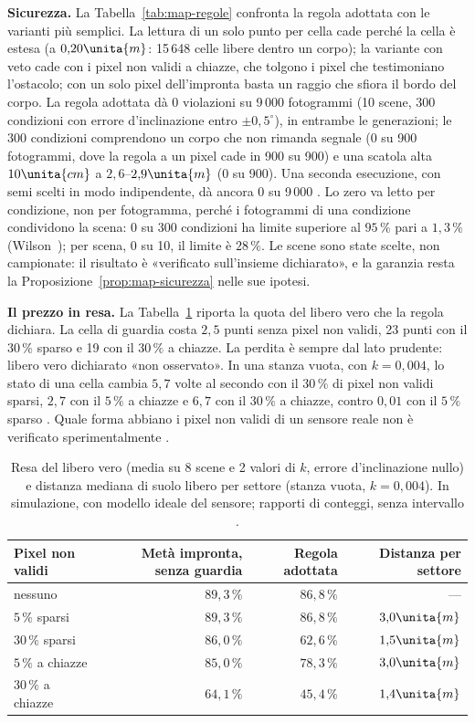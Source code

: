 \textbf{Sicurezza.} La Tabella~\ref{tab:map-regole} confronta la regola adottata con le varianti più semplici. La lettura di un solo punto per cella cade perché la cella è estesa (a $0{,}20\unita{m}$: 15\,648 celle libere dentro un corpo); la variante con veto cade con i pixel non validi a chiazze, che tolgono i pixel che testimoniano l'ostacolo; con un solo pixel dell'impronta basta un raggio che sfiora il bordo del corpo. La regola adottata dà 0 violazioni su 9\,000 fotogrammi (10 scene, 300 condizioni con errore d'inclinazione entro $\pm0{,}5^\circ$), in entrambe le generazioni; le 300 condizioni comprendono un corpo che non rimanda segnale (0 su 900 fotogrammi, dove la regola a un pixel cade in 900 su 900) e una scatola alta $10\unita{cm}$ a $2{,}6$–$2{,}9\unita{m}$ (0 su 900). Una seconda esecuzione, con semi scelti in modo indipendente, dà ancora 0 su 9\,000 . Lo zero va letto per condizione, non per fotogramma, perché i fotogrammi di una condizione condividono la scena: 0 su 300 condizioni ha limite superiore al $95\,\%$ pari a $1{,}3\,\%$ (Wilson~\cite{wilson1927}); per scena, 0 su 10, il limite è $28\,\%$. Le scene sono state scelte, non campionate: il risultato è «verificato sull'insieme dichiarato», e la garanzia resta la Proposizione~\ref{prop:map-sicurezza} nelle sue ipotesi.

\textbf{Il prezzo in resa.} La Tabella~\ref{tab:map-resa} riporta la quota del libero vero che la regola dichiara. La cella di guardia costa $2{,}5$ punti senza pixel non validi, 23 punti con il $30\,\%$ sparso e 19 con il $30\,\%$ a chiazze. La perdita è sempre dal lato prudente: libero vero dichiarato «non osservato». In una stanza vuota, con $k=0{,}004$, lo stato di una cella cambia $5{,}7$ volte al secondo con il $30\,\%$ di pixel non validi sparsi, $2{,}7$ con il $5\,\%$ a chiazze e $6{,}7$ con il $30\,\%$ a chiazze, contro $0{,}01$ con il $5\,\%$ sparso . Quale forma abbiano i pixel non validi di un sensore reale non è verificato sperimentalmente .

\begin{table}[t]\centering\small
\caption{Resa del libero vero (media su 8 scene e 2 valori di $k$, errore d'inclinazione nullo) e distanza mediana di suolo libero per settore (stanza vuota, $k=0{,}004$). In simulazione, con modello ideale del sensore; rapporti di conteggi, senza intervallo .}\label{tab:map-resa}
\begin{tabular}{lrrr}
\toprule
Pixel non validi & Metà impronta, senza guardia & Regola adottata & Distanza per settore\\
\midrule
nessuno & $89{,}3\,\%$ & $86{,}8\,\%$ & —\\
$5\,\%$ sparsi & $89{,}3\,\%$ & $86{,}8\,\%$ & $3{,}0\unita{m}$\\
$30\,\%$ sparsi & $86{,}0\,\%$ & $62{,}6\,\%$ & $1{,}5\unita{m}$\\
$5\,\%$ a chiazze & $85{,}0\,\%$ & $78{,}3\,\%$ & $3{,}0\unita{m}$\\
$30\,\%$ a chiazze & $64{,}1\,\%$ & $45{,}4\,\%$ & $1{,}4\unita{m}$\\
\bottomrule
\end{tabular}
\end{table}

